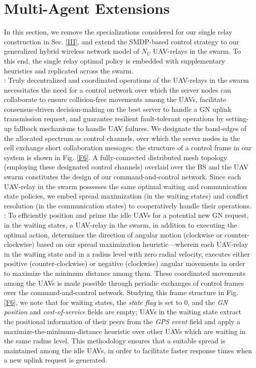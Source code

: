 \documentclass[10pt,twocolumn]{IEEEtran}
\begin{document}
\vspace{-6mm}
\section{Multi-Agent Extensions}\label{IV}
In this section, we remove the specializations considered for our single relay construction in Sec. \ref{III}, and extend the SMDP-based control strategy to our generalized hybrid wireless network model of $N_{U}$ UAV-relays in the swarm. To this end, the single relay optimal policy is embedded with supplementary heuristics and replicated across the swarm.\\
: Truly decentralized and coordinated operations of the UAV-relays in the swarm necessitates the need for a control network over which the server nodes can collaborate to ensure collision-free movements among the UAVs, facilitate consensus-driven decision-making on the best server to handle a GN uplink transmission request, and guarantee resilient fault-tolerant operations by setting-up fallback mechanisms to handle UAV failures. We designate the band-edges of the allocated spectrum as control channels, over which the server nodes in the cell exchange short collaboration messages: the structure of a control frame in our system is shown in Fig. \ref{F6}. A fully-connected distributed mesh topology (employing these designated control channels) overlaid over the BS and the UAV swarm constitutes the design of our command-and-control network. Since each UAV-relay in the swarm possesses the same optimal waiting and communication state policies, we embed spread maximization (in the waiting states) and conflict resolution (in the communication states) to cooperatively handle their operations.\\
: To efficiently position and prime the idle UAVs for a potential new GN request, in the waiting states, a UAV-relay in the swarm, in addition to executing the optimal action, determines the direction of angular motion (clockwise or counter-clockwise) based on our spread maximization heuristic---wherein each UAV-relay in the waiting state and in a radius level with zero radial velocity, executes either positive (counter-clockwise) or negative (clockwise) angular movements in order to maximize the minimum distance among them. These coordinated movements among the UAVs is made possible through periodic exchanges of control frames over the command-and-control network. Studying this frame structure in Fig. \ref{F6}, we note that for waiting states, the \textit{state flag} is set to $0$, and the \textit{GN position} and \textit{cost-of-service} fields are empty; UAVs in the waiting state extract the positional information of their peers from the \textit{GPS event} field and apply a maximize-the-minimum-distance heuristic over other UAVs which are waiting in the same radius level. This methodology ensures that a suitable spread is maintained among the idle UAVs, in order to facilitate faster response times when a new uplink request is generated.
\end{document}
